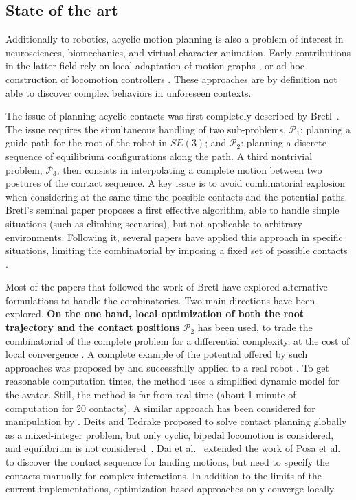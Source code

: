 \subsection{State of the art}



Additionally to robotics, acyclic motion planning is also a problem of interest in neurosciences, biomechanics, and virtual character animation.
Early contributions in the latter field rely on local adaptation of motion graphs \citep{citeulike:220163}, or ad-hoc construction of locomotion controllers \citep{Pettre:2003:LPD:846276.846313}. These approaches are by definition not able to discover complex behaviors in unforeseen contexts.

The issue of planning acyclic contacts was first completely described by Bretl~\cite{Bretl:2006:MPM:1124573.1124585}. The issue requires the simultaneous handling of two sub-problems, $\mathcal{P}_1$: planning a guide path for the root of the robot in $SE(3)$; and $\mathcal{P}_2$: planning a discrete sequence of equilibrium configurations along the path. A third nontrivial problem, $\mathcal{P}_3$, 
then consists in interpolating a complete motion between two postures of the contact sequence.  A key issue is to avoid combinatorial explosion when considering at the same time the possible contacts and the potential paths. Bretl's seminal paper proposes a first effective algorithm, able to handle simple situations (such as climbing scenarios), but not applicable to arbitrary environments. Following it, seve\-ral papers have applied this approach in specific situations, limiting the combinatorial by imposing a fixed set of possible contacts \citep{Hauser06usingmotion, stilman2010}.

Most of the papers that followed the work of Bretl have explored alternative formulations to handle the combinatorics. Two main directions have been explored. \textbf{On the one hand, local optimization of both the root trajectory \Pa and the contact positions $\mathcal{P}_2$} has been used, to trade the combinatorial of the complete problem for a differential complexity, at the cost of local convergence \citep{1631739}. A complete example of the potential offered by such approaches was proposed by \cite{Mordatch:2012:DCB:2185520.2185539} and successfully applied to a real robot \citep{mordatch2015}. To get reasonable computation times, the method uses a simplified dynamic model for the avatar. Still, the method is far from real-time  (about 1 minute of computation for 20 contacts).  A similar approach has been considered for manipulation by \cite{gabicciniisrr15}. Deits and Tedrake proposed to solve contact planning globally as a mixed-integer problem, but only cyclic, bipedal locomotion is considered, and equilibrium is not considered~\cite{DBLP:conf/humanoids/DeitsT14}. 
Dai et al.~\cite{dai2014whole} extended the work of Posa et al.~\cite{Posa:2014:DMT:2568343.2568352} to discover the contact sequence for landing motions, but need to specify
the contacts manually for complex interactions.
In addition to the limits of the current implementations, optimization-based approaches only converge locally.

